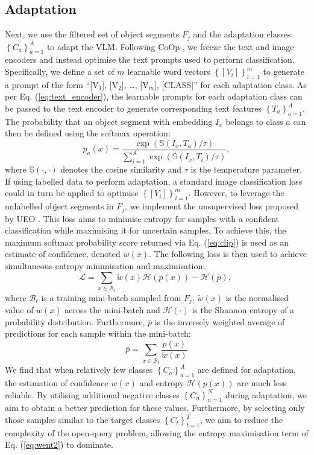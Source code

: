 \subsection{Adaptation}
Next, we use the filtered set of object segments $F_{j}$ and the adaptation classes $\left\{C_{a} \right\}_{a=1}^{A}$ to adapt the VLM. Following CoOp \cite{coop}, we freeze the text and image encoders and instead optimise the text prompts used to perform classification. Specifically, we define a set of $m$ learnable word vectors $\left\{\left[V_{i} \right]\right\}_{i=1}^{m}$ to generate a prompt of the form ``[V$_1$], [V$_2$], \dots, [V$_m$], [CLASS]'' for each adaptation class. As per Eq. (\ref{eq:text_encoder}), the learnable prompts for each adaptation class can be passed to the text encoder to generate corresponding text features $\left\{T_{a} \right\}_{a=1}^{A}$. The probability that an object segment with embedding $I_{x}$ belongs to class $a$ can then be defined using the softmax operation:
\begin{equation} 
\label{eq:clip}
p_a(x) = \frac{\exp(\mathbb{S}(I_x, T_a)/ \tau)} {\sum_{i=1}^{A} \exp(\mathbb{S}(I_x, T_i)/\tau)},
\end{equation}
where $\mathbb{S}(\cdot, \cdot)$ denotes the cosine similarity and $\tau$ is the temperature parameter. If using labelled data to perform adaptation, a standard image classification loss could in turn be applied to optimise $\left\{\left[V_{i} \right]\right\}_{i=1}^{m}$. However, to leverage the unlabelled object segments in $F_{j}$, we implement the unsupervised loss proposed by UEO \cite{ueo}. This loss aims to minimise entropy for samples with a confident classification while maximising it for uncertain samples. To achieve this, the maximum softmax probability score returned via Eq. (\ref{eq:clip}) is used as an estimate of confidence, denoted $w\left(x\right)$. The following loss is then used to achieve simultaneous entropy minimisation and maximisation:
\begin{equation}
\mathcal{L} = \sum_{x \in \mathcal{B}_t} \widetilde{w}(x) \mathcal{H}(p(x)) - \mathcal{H}(\bar{p}),\; 
\label{eq:went2}
\end{equation}
where $\mathcal{B}_t$ is a training mini-batch sampled from $F_{j}$, $\widetilde{w}(x)$ is the normalised value of $w(x)$ across the mini-batch and $\mathcal{H}(\cdot)$ is the Shannon entropy of a probability distribution. Furthermore, $\bar{p}$ is the inversely weighted average of predictions for each sample within the mini-batch:
\begin{equation}
\bar{p} = \sum_{x \in \mathcal{B}_t} \frac{p(x)}{\widetilde{w}(x)}
\end{equation}
We find that when relatively few classes $\left\{C_{a} \right\}_{a=1}^{A}$ are defined for adaptation, the estimation of confidence $w(x)$ and entropy $\mathcal{H}(p(x))$ are much less reliable. By utilising additional negative classes $\left\{C_{n} \right\}_{n=1}^{N}$ during adaptation, we aim to obtain a better prediction for these values. Furthermore, by selecting only those samples similar to the target classes $\left\{C_{t} \right\}_{t=1}^{T}$, we aim to reduce the complexity of the open-query problem, allowing the entropy maximisation term of Eq. (\ref{eq:went2}) to dominate.

